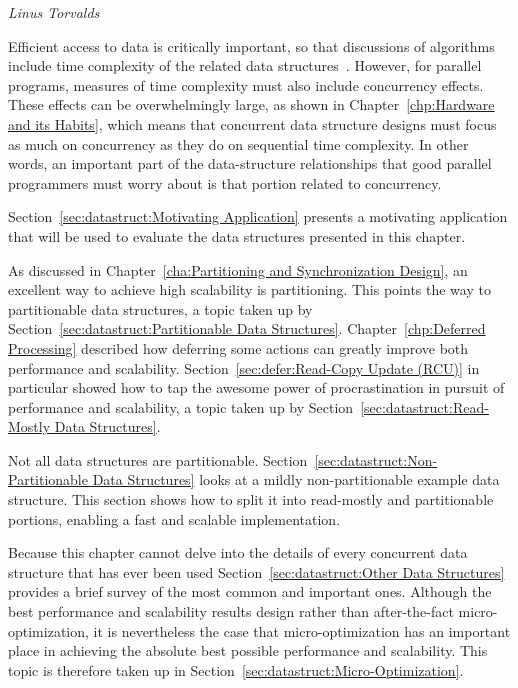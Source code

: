 
%
	 {\emph{Linus Torvalds}}

Efficient access to data is critically important, so that
discussions of algorithms include time complexity of the related
data structures~\cite{ThomasHCorman2001Algorithms}.
However, for parallel programs, measures of time complexity must also
include concurrency effects.
These effects can be overwhelmingly large, as shown in
Chapter~\ref{chp:Hardware and its Habits}, which means that
concurrent data structure designs must focus as much on
concurrency as they do on sequential time complexity.
In other words, an important part of the data-structure relationships
that good parallel programmers must worry about is that portion
related to concurrency.

Section~\ref{sec:datastruct:Motivating Application}
presents a motivating application that will be used to evaluate
the data structures presented in this chapter.

As discussed in Chapter~\ref{cha:Partitioning and Synchronization Design},
an excellent way to achieve high scalability is partitioning.
This points the way to partitionable data structures, a topic taken up by
Section~\ref{sec:datastruct:Partitionable Data Structures}.
Chapter~\ref{chp:Deferred Processing} described how deferring some
actions can greatly improve both performance and scalability.
Section~\ref{sec:defer:Read-Copy Update (RCU)} in particular showed
how to tap the awesome power of procrastination in pursuit of
performance and scalability, a topic taken up by
Section~\ref{sec:datastruct:Read-Mostly Data Structures}.

Not all data structures are partitionable.
Section~\ref{sec:datastruct:Non-Partitionable Data Structures}
looks at a mildly non-partitionable example data structure.
This section shows
how to split it into read-mostly and partitionable portions,
enabling a fast and scalable implementation.

Because this chapter cannot delve into the details of every concurrent
data structure that has ever been used
Section~\ref{sec:datastruct:Other Data Structures}
provides a brief survey of the most common and important ones.
Although the best performance and scalability results design rather
than after-the-fact micro-optimization, it is nevertheless the case
that micro-optimization has an important place in achieving the
absolute best possible performance and scalability.
This topic is therefore taken up in
Section~\ref{sec:datastruct:Micro-Optimization}.

